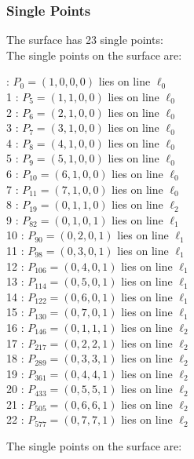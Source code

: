 \documentclass{article}
\begin{document}
{\subsubsection*{Single Points}
The surface has 23 single points:\\
The single points on the surface are:\\
\begin{multicols}{2}
 : $P_{0}=( 1, 0, 0, 0 )$ lies on line $\ell_{0}$\\
1 : $P_{5}=( 1, 1, 0, 0 )$ lies on line $\ell_{0}$\\
2 : $P_{6}=( 2, 1, 0, 0 )$ lies on line $\ell_{0}$\\
3 : $P_{7}=( 3, 1, 0, 0 )$ lies on line $\ell_{0}$\\
4 : $P_{8}=( 4, 1, 0, 0 )$ lies on line $\ell_{0}$\\
5 : $P_{9}=( 5, 1, 0, 0 )$ lies on line $\ell_{0}$\\
6 : $P_{10}=( 6, 1, 0, 0 )$ lies on line $\ell_{0}$\\
7 : $P_{11}=( 7, 1, 0, 0 )$ lies on line $\ell_{0}$\\
8 : $P_{19}=( 0, 1, 1, 0 )$ lies on line $\ell_{2}$\\
9 : $P_{82}=( 0, 1, 0, 1 )$ lies on line $\ell_{1}$\\
10 : $P_{90}=( 0, 2, 0, 1 )$ lies on line $\ell_{1}$\\
11 : $P_{98}=( 0, 3, 0, 1 )$ lies on line $\ell_{1}$\\
12 : $P_{106}=( 0, 4, 0, 1 )$ lies on line $\ell_{1}$\\
13 : $P_{114}=( 0, 5, 0, 1 )$ lies on line $\ell_{1}$\\
14 : $P_{122}=( 0, 6, 0, 1 )$ lies on line $\ell_{1}$\\
15 : $P_{130}=( 0, 7, 0, 1 )$ lies on line $\ell_{1}$\\
16 : $P_{146}=( 0, 1, 1, 1 )$ lies on line $\ell_{2}$\\
17 : $P_{217}=( 0, 2, 2, 1 )$ lies on line $\ell_{2}$\\
18 : $P_{289}=( 0, 3, 3, 1 )$ lies on line $\ell_{2}$\\
19 : $P_{361}=( 0, 4, 4, 1 )$ lies on line $\ell_{2}$\\
20 : $P_{433}=( 0, 5, 5, 1 )$ lies on line $\ell_{2}$\\
21 : $P_{505}=( 0, 6, 6, 1 )$ lies on line $\ell_{2}$\\
22 : $P_{577}=( 0, 7, 7, 1 )$ lies on line $\ell_{2}$\\
\end{multicols}
The single points on the surface are:\\
}
\end{document}
